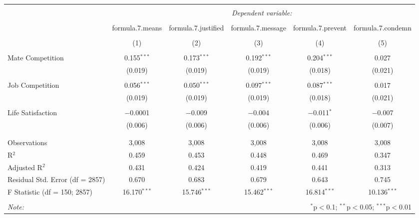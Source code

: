 
\begin{table}[!htbp] \centering 
  \caption{} 
  \label{} 
\begin{tabular}{@{\extracolsep{5pt}}lccccc} 
\\[-1.8ex]\hline 
\hline \\[-1.8ex] 
 & \multicolumn{5}{c}{\textit{Dependent variable:}} \\ 
\cline{2-6} 
\\[-1.8ex] & formula.7.means & formula.7.justified & formula.7.message & formula.7.prevent & formula.7.condemn \\ 
\\[-1.8ex] & (1) & (2) & (3) & (4) & (5)\\ 
\hline \\[-1.8ex] 
 Mate Competition & 0.155$^{***}$ & 0.173$^{***}$ & 0.192$^{***}$ & 0.204$^{***}$ & 0.027 \\ 
  & (0.019) & (0.019) & (0.019) & (0.018) & (0.021) \\ 
  & & & & & \\ 
 Job Competition & 0.056$^{***}$ & 0.050$^{***}$ & 0.097$^{***}$ & 0.087$^{***}$ & 0.017 \\ 
  & (0.019) & (0.019) & (0.019) & (0.018) & (0.021) \\ 
  & & & & & \\ 
 Life Satisfaction & $-$0.0001 & $-$0.009 & $-$0.004 & $-$0.011$^{*}$ & $-$0.007 \\ 
  & (0.006) & (0.006) & (0.006) & (0.006) & (0.007) \\ 
  & & & & & \\ 
\hline \\[-1.8ex] 
Observations & 3,008 & 3,008 & 3,008 & 3,008 & 3,008 \\ 
R$^{2}$ & 0.459 & 0.453 & 0.448 & 0.469 & 0.347 \\ 
Adjusted R$^{2}$ & 0.431 & 0.424 & 0.419 & 0.441 & 0.313 \\ 
Residual Std. Error (df = 2857) & 0.670 & 0.683 & 0.679 & 0.643 & 0.745 \\ 
F Statistic (df = 150; 2857) & 16.170$^{***}$ & 15.746$^{***}$ & 15.462$^{***}$ & 16.814$^{***}$ & 10.136$^{***}$ \\ 
\hline 
\hline \\[-1.8ex] 
\textit{Note:}  & \multicolumn{5}{r}{$^{*}$p$<$0.1; $^{**}$p$<$0.05; $^{***}$p$<$0.01} \\ 
\end{tabular} 
\end{table} 
